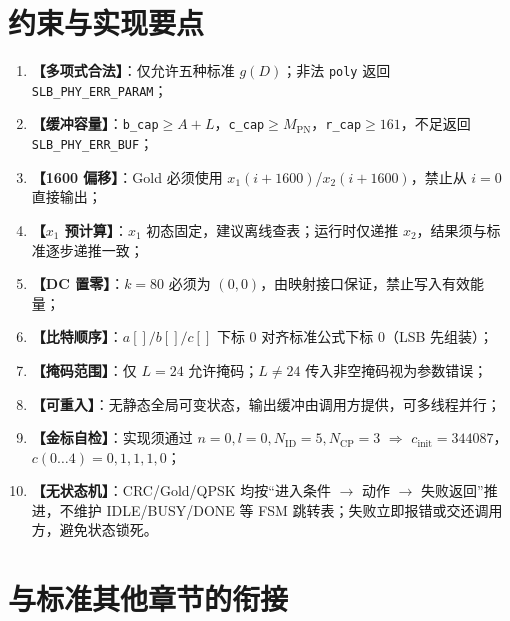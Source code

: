 \documentclass[11pt,a4paper]{ctexart}
\begin{document}
\section{约束与实现要点}

\begin{enumerate}[nosep]
  \item \textbf{【多项式合法】}：仅允许五种标准 $g(D)$；非法 \texttt{poly} 返回 \texttt{SLB\_PHY\_ERR\_PARAM}；
  \item \textbf{【缓冲容量】}：\texttt{b\_cap}$\geq A{+}L$，\texttt{c\_cap}$\geq M_{\mathrm{PN}}$，\texttt{r\_cap}$\geq 161$，不足返回 \texttt{SLB\_PHY\_ERR\_BUF}；
  \item \textbf{【1600 偏移】}：Gold 必须使用 $x_1(i{+}1600)$/$x_2(i{+}1600)$，禁止从 $i{=}0$ 直接输出；
  \item \textbf{【$x_1$ 预计算】}：$x_1$ 初态固定，建议离线查表；运行时仅递推 $x_2$，结果须与标准逐步递推一致；
  \item \textbf{【DC 置零】}：$k{=}80$ 必须为 $(0,0)$，由映射接口保证，禁止写入有效能量；
  \item \textbf{【比特顺序】}：$a[]/b[]/c[]$ 下标 0 对齐标准公式下标 0（LSB 先组装）；
  \item \textbf{【掩码范围】}：仅 $L{=}24$ 允许掩码；$L{\neq}24$ 传入非空掩码视为参数错误；
  \item \textbf{【可重入】}：无静态全局可变状态，输出缓冲由调用方提供，可多线程并行；
  \item \textbf{【金标自检】}：实现须通过 $n{=}0,l{=}0,N_{\mathrm{ID}}{=}5,N_{\mathrm{CP}}{=}3$ $\Rightarrow$ $c_{\mathrm{init}}{=}344087$，$c(0\ldots 4){=}0,1,1,1,0$；
  \item \textbf{【无状态机】}：CRC/Gold/QPSK 均按``进入条件 $\rightarrow$ 动作 $\rightarrow$ 失败返回''推进，不维护 IDLE/BUSY/DONE 等 FSM 跳转表；失败立即报错或交还调用方，避免状态锁死。
\end{enumerate}

\section{与标准其他章节的衔接}
\end{document}
